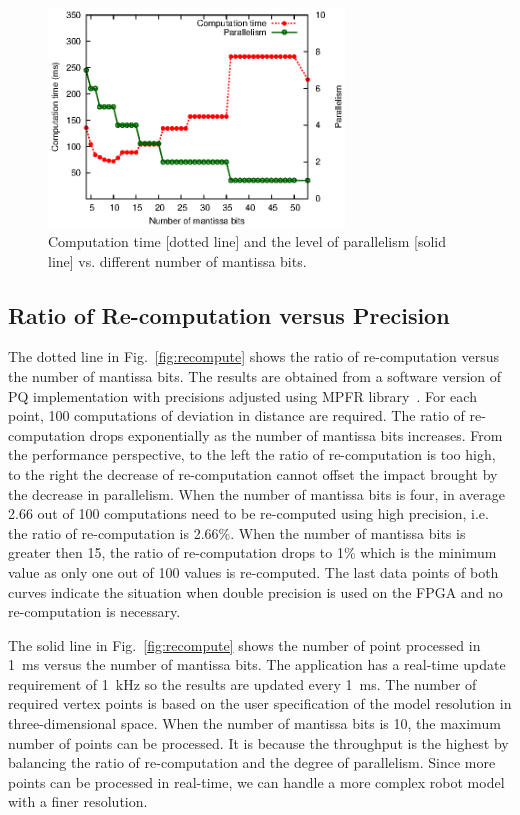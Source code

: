 \begin{figure}[ht]
\begin{center}
\includegraphics[width=0.7\textwidth]{mixed_precision/figures/fig_exectime}
\end{center}
\caption{Computation time [dotted line] and the level of parallelism [solid line] 
vs. different number of mantissa bits.}
\label{fig:exectime}
\end{figure}

\subsection{Ratio of Re-computation versus Precision}
\label{sec:recompute}
The dotted line in Fig.~\ref{fig:recompute} shows the ratio of re-computation versus the number of mantissa bits.
The results are obtained from a software version of PQ implementation with precisions adjusted using MPFR library~\cite{fousse07}.
For each point, 100 computations of deviation in distance are required.
The ratio of re-computation drops exponentially as the number of mantissa bits increases.
From the performance perspective, to the left the ratio of re-computation is too high, to the right the decrease of re-computation cannot offset the impact brought by the decrease in parallelism.
When the number of mantissa bits is four, in average 2.66 out of 100 computations need to be re-computed using high precision, i.e. the ratio of re-computation is 2.66\%.
When the number of mantissa bits is greater then 15, the ratio of re-computation drops to 1\% which is the minimum value as only one out of 100 values is re-computed.
The last data points of both curves indicate the situation when double precision is used on the FPGA and no re-computation is necessary.

The solid line in Fig.~\ref{fig:recompute} shows the number of point processed in 1~ms versus the number of mantissa bits.
The application has a real-time update requirement of 1~kHz so the results are updated every 1~ms.
The number of required vertex points is based on the user specification of the model resolution in three-dimensional space.
When the number of mantissa bits is 10, the maximum number of points can be processed.
It is because the throughput is the highest by balancing the ratio of re-computation and the degree of parallelism.
Since more points can be processed in real-time, we can handle a more complex robot model with a finer resolution.

